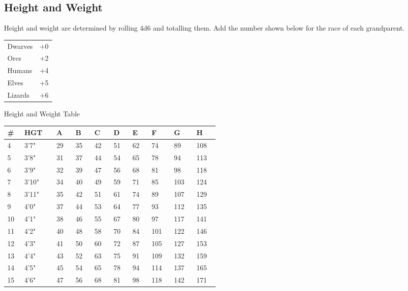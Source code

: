 \begin{multicols*}{2}
\section{Height and Weight}
Height and weight are determined by rolling 4d6 and totalling them. Add the number shown below for the race of each grandparent.
\begin{tcolorbox}[breakable,boxrule=0pt]
\begin{tabular}{l l}
Dwarves & +0\\
Orcs & +2\\
Humans & +4\\
Elves & +5\\
Lizards & +6\\
\end{tabular}
\end{tcolorbox}
\columnbreak
\begin{center}
\large
Height and Weight Table
\end{center}
\normalsize
\begin{tcolorbox}[breakable,boxrule=0pt]
\begin{tabular}{ p{0.03\linewidth} p{0.07\linewidth} p{0.05\linewidth} p{0.05\linewidth} p{0.05\linewidth} p{0.05\linewidth} p{0.05\linewidth} p{0.05\linewidth} p{0.05\linewidth} p{0.05\linewidth} }
\# & HGT & A & B & C & D & E & F & G & H\\
\midrule
4 & 3'7" & 29 & 35 & 42 & 51 & 62 & 74 & 89 & 108\\
5 & 3'8" & 31 & 37 & 44 & 54 & 65 & 78 & 94 & 113\\
6 & 3'9" & 32 & 39 & 47 & 56 & 68 & 81 & 98 & 118\\
7 & 3'10" & 34 & 40 & 49 & 59 & 71 & 85 & 103 & 124\\
8 & 3'11" & 35 & 42 & 51 & 61 & 74 & 89 & 107 & 129\\
9 & 4'0" & 37 & 44 & 53 & 64 & 77 & 93 & 112 & 135\\
10 & 4'1" & 38 & 46 & 55 & 67 & 80 & 97 & 117 & 141\\
11 & 4'2" & 40 & 48 & 58 & 70 & 84 & 101 & 122 & 146\\
12 & 4'3" & 41 & 50 & 60 & 72 & 87 & 105 & 127 & 153\\
13 & 4'4" & 43 & 52 & 63 & 75 & 91 & 109 & 132 & 159\\
14 & 4'5" & 45 & 54 & 65 & 78 & 94 & 114 & 137 & 165\\
15 & 4'6" & 47 & 56 & 68 & 81 & 98 & 118 & 142 & 171\\

\end{tabular}
\end{tcolorbox}
\end{multicols*}

